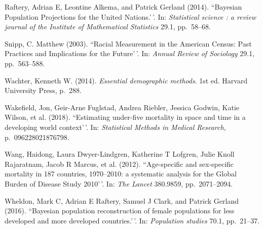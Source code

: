 \documentclass[11pt,]{article}
\begin{document}
Raftery, Adrian E, Leontine Alkema, and Patrick Gerland (2014).
``Bayesian Population Projections for the United Nations.'\,'. In:
\emph{Statistical science : a review journal of the Institute of Mathematical Statistics}
29.1, pp.~58--68.

Snipp, C. Matthew (2003). ``Racial Measurement in the American Census:
Past Practices and Implications for the Future'\,'. In:
\emph{Annual Review of Sociology} 29.1, pp.~563--588.

Wachter, Kenneth W. (2014). \emph{Essential demographic methods}. 1st
ed. Harvard University Press, p.~288.

Wakefield, Jon, Geir-Arne Fuglstad, Andrea Riebler, Jessica Godwin,
Katie Wilson, et al. (2018). ``Estimating under-five mortality in space
and time in a developing world context'\,'. In:
\emph{Statistical Methods in Medical Research}, p.~096228021876798.

Wang, Haidong, Laura Dwyer-Lindgren, Katherine T Lofgren, Julie Knoll
Rajaratnam, Jacob R Marcus, et al. (2012). ``Age-specific and
sex-specific mortality in 187 countries, 1970--2010: a systematic
analysis for the Global Burden of Disease Study 2010'\,'. In:
\emph{The Lancet} 380.9859, pp.~2071--2094.

Wheldon, Mark C, Adrian E Raftery, Samuel J Clark, and Patrick Gerland
(2016). ``Bayesian population reconstruction of female populations for
less developed and more developed countries.'\,'. In:
\emph{Population studies} 70.1, pp.~21--37.
\end{document}
